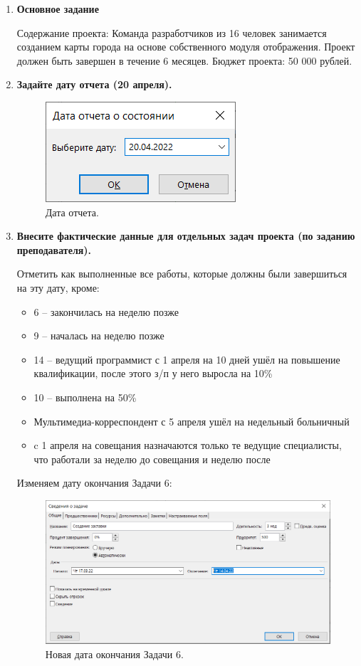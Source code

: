 \documentclass[a4paper,14pt]{extreport} %
\begin{document}
\begin{enumerate}

\item \textbf{Основное задание}

Содержание проекта: Команда разработчиков из 16 человек занимается созданием карты города на основе собственного модуля отображения. Проект должен быть завершен в течение 6 месяцев. Бюджет проекта: 50 000 рублей.

\item \textbf{Задайте дату отчета (20 апреля).}

\begin{figure}[H]
  \centering
  \caption{Дата отчета. }
  \includegraphics[scale=1.5]{1}
\end{figure}

\item \textbf{Внесите фактические данные для отдельных задач проекта (по заданию преподавателя).}

Отметить как выполненные все работы, которые должны были завершиться на эту дату, кроме:
\begin{itemize}
	\item 6 -- закончилась на неделю позже 
	\item 9 -- началась на неделю позже
	\item 14 -- ведущий программист с 1 апреля на 10 дней ушёл на повышение квалификации, после этого з/п у него выросла на 10\%
	\item 10 -- выполнена на 50\%
	\item Мультимедиа-корреспондент с 5 апреля ушёл на недельный больничный
	\item c 1 апреля на совещания назначаются только те ведущие специалисты, что работали за неделю до совещания и неделю после
\end{itemize}

\newpage

Изменяем дату окончания Задачи 6:
\begin{figure}[H]
	\centering
	\caption{Новая дата окончания Задачи 6. }
	\includegraphics[scale=0.7]{delay-task6}
\end{figure}


\end{enumerate}
\end{document}
